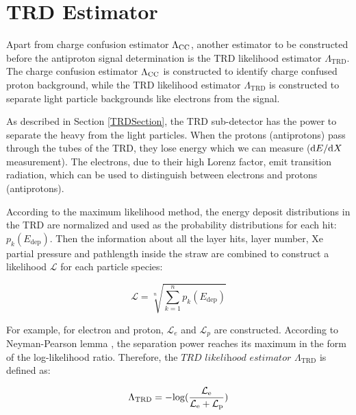 
\section{TRD Estimator} \label{TRDEstimatorSection}

Apart from charge confusion estimator ${\Lambda_{\rm{CC}}}$, another estimator to be constructed before the antiproton signal determination is the TRD likelihood estimator $\Lambda_\mathrm{TRD}$. The charge confusion estimator ${\Lambda_{\rm{CC}}}$ is constructed to identify charge confused proton background, while the TRD likelihood estimator $\Lambda_\mathrm{TRD}$ is constructed to separate light particle backgrounds like electrons from the signal. \par

As described in Section \ref{TRDSection}, the TRD sub-detector has the power to separate the heavy from the light particles. When the protons (antiprotons) pass through the tubes of the TRD, they lose energy which we can measure (${\rm{d}}E/{\rm{d}}X$ measurement). The electrons, due to their high Lorenz factor, emit transition radiation, which can be used to distinguish between electrons and protons (antiprotons). \par
    
According to the maximum likelihood method, the energy deposit distributions in the TRD are normalized and used as the probability distributions for each hit: $p_k(E_\mathrm{dep})$. Then the information about all the layer hits, layer number, Xe partial pressure and pathlength inside the straw are combined to construct a likelihood $\mathcal{L}$ for each particle species:


\begin{equation}
 \mathcal{L}=\sqrt[n]{\sum_{k=1}^{n}{p_{k}(E_\mathrm{dep})}}
\end{equation}  

For example, for electron and proton, $\mathcal{L}_{e}$ and $\mathcal{L}_{p}$ are constructed. According to Neyman-Pearson lemma \cite{MaximumLikelihoodForm}, the separation power reaches its maximum in the form of the log-likelihood ratio. Therefore, the $\textit{TRD likelihood estimator}$ $\Lambda_\mathrm{TRD}$ is defined as:

\begin{equation}
\label{TRDLogLikelihoodEquation}
\Lambda_\mathrm{TRD} = -\rm{log}(\frac{\mathcal{L}_{e}}{\mathcal{L}_{e}+\mathcal{L}_{p}})
\end{equation} 

